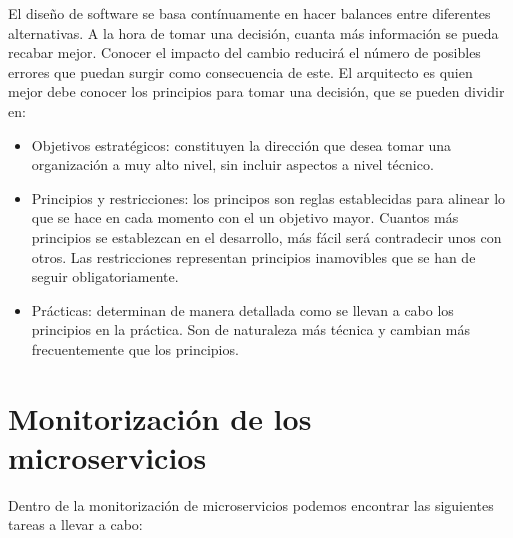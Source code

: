\documentclass[11pt,a4paper]{article}
\begin{document}
El diseño de software se basa contínuamente en hacer balances entre diferentes alternativas. A la hora de tomar una decisión, cuanta más información se pueda recabar mejor. Conocer el impacto del cambio reducirá el número de posibles errores que puedan surgir como consecuencia de este. El arquitecto es quien mejor debe conocer los principios para tomar una decisión, que se pueden dividir en:

\begin{itemize}

\item Objetivos estratégicos: constituyen la dirección que desea tomar una organización a muy alto nivel, sin incluir aspectos a nivel técnico.

\item Principios y restricciones: los principos son reglas establecidas para alinear lo que se hace en cada momento con el un objetivo mayor. Cuantos más principios se establezcan en el desarrollo, más fácil será contradecir unos con otros. Las restricciones representan principios inamovibles que se han de seguir obligatoriamente.

\item Prácticas: determinan de manera detallada como se llevan a cabo los principios en la práctica. Son de naturaleza más técnica y cambian más frecuentemente que los principios.

\end{itemize}

\section{Monitorización de los microservicios}

Dentro de la monitorización de microservicios podemos encontrar las siguientes tareas a llevar a cabo:
\end{document}
